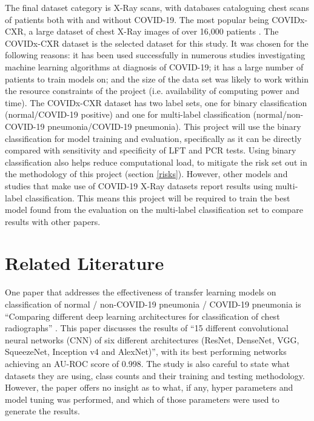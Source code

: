 The final dataset category is X-Ray scans, with databases cataloguing chest scans of patients both with and without COVID-19. The most popular being COVIDx-CXR, a large dataset of chest X-Ray images of over 16,000 patients \citep{wang2020covid}. The COVIDx-CXR dataset is the selected dataset for this study. It was chosen for the following reasons: it has been used successfully in numerous studies investigating machine learning algorithms at diagnosis of COVID-19; it has a large number of patients to train models on; and the size of the data set was likely to work within the resource constraints of the project (i.e. availability of computing power and time). The COVIDx-CXR dataset has two label sets, one for binary classification (normal/COVID-19 positive) and one for multi-label classification (normal/non-COVID-19 pneumonia/COVID-19 pneumonia). This project will use the binary classification for model training and evaluation, specifically as it can be directly compared with sensitivity and specificity of LFT and PCR tests. Using binary classification also helps reduce computational load, to mitigate the risk set out in the methodology of this project (section \ref{risks}). However, other models and studies that make use of COVID-19 X-Ray datasets report results using multi-label classification. This means this project will be required to train the best model found from the evaluation on the multi-label classification set to compare results with other papers.

\section{Related Literature}
One paper that addresses the effectiveness of transfer learning models on classification of normal / non-COVID-19 pneumonia / COVID-19 pneumonia is “Comparing different deep learning architectures for classification of chest radiographs” \citep{bressem2020comparing}. This paper discusses the results of “15 different convolutional neural networks (CNN) of six different architectures (ResNet, DenseNet, VGG, SqueezeNet, Inception v4 and AlexNet)”, with its best performing networks achieving an AU-ROC score of 0.998. The study is also careful to state what datasets they are using, class counts and their training and testing methodology. However, the paper offers no insight as to what, if any, hyper parameters and model tuning was performed, and which of those parameters were used to generate the results. 

